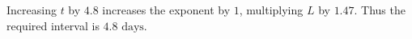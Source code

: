 Increasing $ t $ by $ 4.8 $ increases the exponent by $ 1 $, multiplying $ L $ by $ 1.47 $. Thus the required interval is $\boxed{4.8\text{ days}}$.
